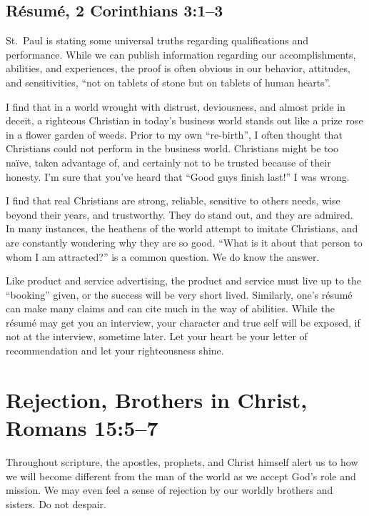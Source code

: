 \documentclass[12pt]{memoir}
\begin{document}
\subsection[Résumé]{Résumé, 2 Corinthians 3:1--3}

St.~Paul is stating some universal truths regarding qualifications and performance.
While we can publish information regarding our accomplishments, abilities, and experiences, the proof is often obvious in our behavior, attitudes, and sensitivities, ``not on tablets of stone but on tablets of human hearts''.

I find that in a world wrought with distrust, deviousness, and almost pride in deceit, a righteous Christian in today's business world stands out like a prize rose in a flower garden of weeds. Prior to my own ``re-birth'', I often thought that Christians could not perform in the business world.
Christians might be too naïve, taken advantage of, and certainly not to be trusted because of their honesty.
I'm sure that you've heard that ``Good guys finish last!'' I was wrong.

I find that real Christians are strong, reliable, sensitive to others needs, wise beyond their years, and trustworthy.
They do stand out, and they are admired. In many instances, the heathens of the world attempt to imitate Christians, and are constantly wondering why they are so good.
``What is it about that person to whom I am attracted?'' is a common question. We do know the answer.

Like product and service advertising, the product and service must live up to the ``booking'' given, or the success will be very short lived. Similarly, one's résumé can make many claims and can cite much in the way of abilities. While the résumé may get you an interview, your character and true self will be exposed, if not at the interview, sometime later. Let your heart be your letter of recommendation and let your righteousness shine.

\section[Rejection, Brothers in Christ]{Rejection, Brothers in Christ, Romans 15:5--7}

Throughout scripture, the apostles, prophets, and Christ himself alert us to how we will become different from the man of the world as we accept God's role and mission. We may even feel a sense of rejection by our worldly brothers and sisters. Do not despair.
\end{document}
